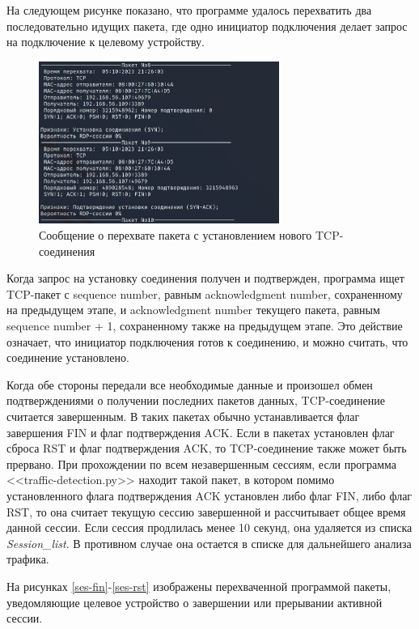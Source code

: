 \documentclass[bachelor, och, coursework]{SCWorks}
\begin{document}
На следующем рисунке показано, что программе удалось перехватить два последовательно идущих пакета, где одно инициатор подключения делает запрос на
подключение к целевому устройству.

\begin{figure}[H]
  \centering
  \includegraphics[width=0.7\textwidth]{photo/ses-syn.jpg}
  \caption{Сообщение о перехвате пакета с установлением нового TCP-соединения}
  \label{ses-syn}
\end{figure}


Когда запрос на установку соединения получен и подтвержден, программа ищет TCP-пакет с sequence number, равным acknowledgment number, 
сохраненному на предыдущем этапе, и acknowledgment number текущего пакета, равным sequence number + 1, сохраненному также на предыдущем 
этапе. Это действие означает, что инициатор подключения готов к соединению, и можно считать, что соединение установлено.


Когда обе стороны передали все необходимые данные и произошел обмен подтверждениями о получении последних пакетов данных, TCP-соединение считается 
завершенным. В таких пакетах обычно устанавливается флаг завершения FIN и флаг подтверждения ACK. Если в пакетах установлен флаг сброса RST и флаг 
подтверждения ACK, то TCP-соединение также может быть прервано. При прохождении по всем незавершенным сессиям, если программа <<traffic-detection.py>> 
находит такой пакет, в котором помимо установленного флага подтверждения ACK установлен либо флаг FIN, либо флаг RST, то она считает текущую сессию 
завершенной и рассчитывает общее время данной сессии. Если сессия продлилась менее 10 секунд, она удаляется из списка \textit{Session_list}. В противном 
случае она остается в списке для дальнейшего анализа трафика.

На рисунках \ref{ses-fin}-\ref{ses-rst} изображены перехваченной программой пакеты, уведомляющие целевое устройство о завершении 
или прерывании активной сессии.
\end{document}
